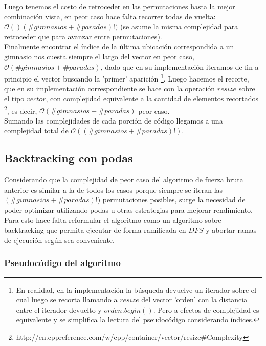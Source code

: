     Luego tenemos el costo de retroceder en las permutaciones hasta la mejor combinación vista, en peor caso hace falta recorrer todas de vuelta: $\mathcal{O}()(\#gimnasios + \#paradas)!)$ (se asume la misma complejidad para retroceder que para avanzar entre permutaciones).
    \\

    Finalmente encontrar el índice de la última ubicación correspondida a un gimnasio nos cuesta siempre el largo del vector en peor caso, $\mathcal{O}(\#gimnasios + \#paradas)$, dado que en su implementación iteramos de fin a principio el vector buscando la 'primer' aparición \footnote{En realidad, en la implementación la búsqueda devuelve un iterador sobre el cual luego se recorta llamando a $resize$ del vector 'orden' con la distancia entre el iterador devuelto y $orden.begin()$. Pero a efectos de complejidad es equivalente y se simplifica la lectura del pseudocódigo considerando índices.}. Luego hacemos el recorte, que en su implementación correspondiente se hace con la operación $resize$ sobre el tipo $vector$, con complejidad equivalente a la cantidad de elementos recortados \footnote{http://en.cppreference.com/w/cpp/container/vector/resize\#Complexity}, es decir, $\mathcal{O}(\#gimnasios + \#paradas)$ peor caso.
    \\

    Sumando las complejidades de cada porción de código llegamos a una complejidad total de $\mathcal{O} ((\#gimnasios + \#paradas)!)$.

    \subsection{Backtracking con podas}

    Considerando que la complejidad de peor caso del algoritmo de fuerza bruta anterior es similar a la de todos los casos porque siempre se iteran las $(\#gimnasios + \#paradas)!)$ permutaciones posibles, surge la necesidad de poder optimizar utilizando podas u otras estrategias para mejorar rendimiento. Para esto hace falta reformular el algoritmo como un algoritmo sobre backtracking que permita ejecutar de forma ramificada en $DFS$ y abortar ramas de ejecución según sea conveniente.
    \\

    \subsubsection{Pseudocódigo del algoritmo}

